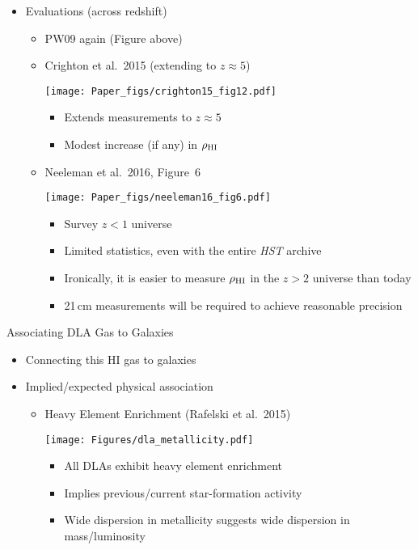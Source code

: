 \documentclass[12pt,letterpaper]{article}
\begin{document}
\begin{Aenumerate}
\begin{itemize}
  \item Evaluations (across redshift)
    \begin{itemize}
    \item PW09 again (Figure above)
    \item Crighton et al.\ 2015 (extending to $z \approx 5$)

\texttt{[image: Paper\_figs/crighton15\_fig12.pdf]}

      \begin{itemize}
      \item Extends measurements to $z \approx 5$
      \item Modest increase (if any) in $\rho_{\rm HI}$
      \end{itemize}

    \item Neeleman et al.\ 2016, Figure~6

\texttt{[image: Paper\_figs/neeleman16\_fig6.pdf]}
      \begin{itemize}
      \item Survey $z<1$ universe
      \item Limited statistics, even with the entire {\it HST} archive
      \item Ironically, it is easier to measure $\rho_{\rm HI}$ in the
      $z>2$ universe than today
      \item 21\,cm measurements will be required to achieve reasonable
      precision
      \end{itemize}

    \end{itemize}

  \end{itemize}

  \clearpage
{\bf \item Associating DLA Gas to Galaxies}
  \begin{itemize}
  \item Connecting this HI gas to galaxies
  \item Implied/expected physical association
    \begin{itemize}

    \item Heavy Element Enrichment (Rafelski et al.\ 2015)

\texttt{[image: Figures/dla\_metallicity.pdf]}

      \begin{itemize}
      \item All DLAs exhibit heavy element enrichment
      \item Implies previous/current star-formation activity
      \item Wide dispersion in metallicity suggests wide
      dispersion in mass/luminosity
      \end{itemize}


\end{itemize}
\end{itemize}
\end{Aenumerate}
\end{document}
